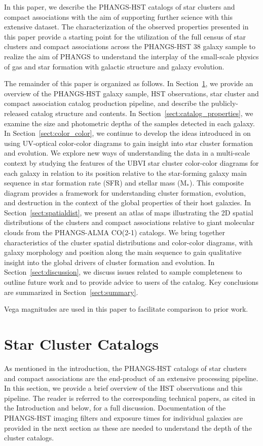 \documentclass[]{aastex631}
\begin{document}
In this paper, we describe the PHANGS-HST catalogs of star clusters and compact associations with the aim of supporting further science with this extensive dataset.  The characterization of the observed properties presented in this paper provide a starting point for the utilization of the full census of star clusters and compact associations across the PHANGS-HST 38 galaxy sample to realize the aim of PHANGS to understand the interplay of the small-scale physics of gas and star formation with galactic structure and galaxy evolution.


The remainder of this paper is organized as follows. In Section~\ref{sect:catalog_content}, we provide an overview of the PHANGS-HST galaxy sample, HST observations, star cluster and compact association catalog production pipeline, and describe the publicly-released catalog structure and contents.  In Section~\ref{sect:catalog_properties}, we examine the size and photometric depths of the samples detected in each galaxy.  In Section~\ref{sect:color_color}, we continue to develop the ideas introduced in \cite{lee23ubvi} on using UV-optical color-color diagrams to gain insight into star cluster formation and evolution.  We explore new ways of understanding the data in a multi-scale context by studying the features of the UBVI star cluster color-color diagrams for each galaxy in relation to its position relative to the star-forming galaxy main sequence in star formation rate (SFR) and stellar mass (M$_*$).  This composite diagram provides a framework for understanding cluster formation, evolution, and destruction in the context of the global properties of their host galaxies.  In Section~\ref{sect:spatialdist}, we present an atlas of maps illustrating the 2D spatial distributions of the clusters and compact associations relative to giant molecular clouds from the PHANGS-ALMA CO(2-1) catalogs.  We bring together characteristics of the cluster spatial distributions and color-color diagrams, with galaxy morphology and position along the main sequence to gain qualitative insight into the global drivers of cluster formation and evolution.  In Section~\ref{sect:discussion}, we discuss issues related to sample completeness to outline future work and to provide advice to users of the catalog.  Key conclusions are summarized in Section~\ref{sect:summary}.

Vega magnitudes are used in this paper to facilitate comparison to prior work.

\section{Star Cluster Catalogs}\label{sect:catalog_content}
As mentioned in the introduction, the PHANGS-HST catalogs of star clusters and compact associations are the end-product of an extensive processing pipeline.  In this section, we provide a brief overview of the HST observations and this pipeline.  The reader is referred to the corresponding technical papers, as cited in the Introduction and below, for a full discussion.  Documentation of the PHANGS-HST imaging filters and exposure times for individual galaxies are provided in the next section as these are needed to understand the depth of the cluster catalogs.   
\end{document}
